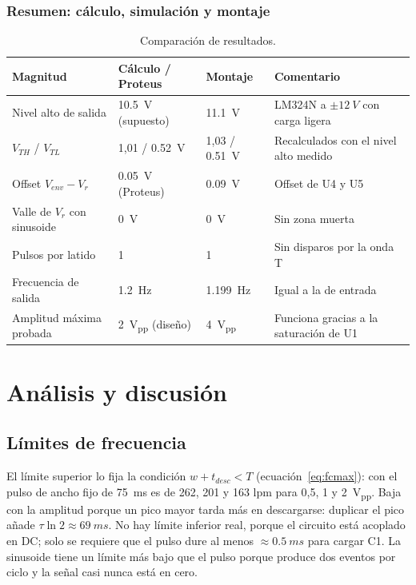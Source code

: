 \documentclass[11pt,letterpaper]{article}
\newcommand{\Vr}{V_r}
\newcommand{\Venv}{V_{env}}
\newcommand{\VTH}{V_{TH}}
\newcommand{\VTL}{V_{TL}}
\begin{document}
\subsubsection{Resumen: cálculo, simulación y montaje}

\begin{table}[H]
\centering
\caption{Comparación de resultados.}\label{tab:labcomparacion}
\small
\begin{tabularx}{\linewidth}{@{}>{\raggedright}p{3.3cm}>{\raggedright}p{2.7cm}>{\raggedright}p{2.4cm}X@{}}
\toprule
Magnitud & Cálculo / Proteus & Montaje & Comentario \\
\midrule
Nivel alto de salida & \SI{10,5}{V} (supuesto) & \SI{11,1}{V} & LM324N a $\pm\SI{12}{V}$ con carga ligera \\
$\VTH$ / $\VTL$ & 1,01 / \SI{0,52}{V} & 1,03 / \SI{0,51}{V} & Recalculados con el nivel alto medido \\
Offset $\Venv-\Vr$ & \SI{0,05}{V} (Proteus) & \SI{0,09}{V} & Offset de U4 y U5 \\
Valle de $\Vr$ con sinusoide & \SI{0}{V} & \SI{0}{V} & Sin zona muerta \\
Pulsos por latido & 1 & 1 & Sin disparos por la onda T \\
Frecuencia de salida & \SI{1,2}{Hz} & \SI{1,199}{Hz} & Igual a la de entrada \\
Amplitud máxima probada & \SI{2}{V_{pp}} (diseño) & \SI{4}{V_{pp}} & Funciona gracias a la saturación de U1 \\
\bottomrule
\end{tabularx}
\end{table}

\section{Análisis y discusión}

\subsection{Límites de frecuencia}
El límite superior lo fija la condición $w+t_{desc}<T$ (ecuación~\ref{eq:fcmax}): con el pulso de ancho fijo de \SI{75}{ms} es de 262, 201 y 163 lpm para 0,5, 1 y \SI{2}{V_{pp}}. Baja con la amplitud porque un pico mayor tarda más en descargarse: duplicar el pico añade $\tau\ln2\approx\SI{69}{ms}$. No hay límite inferior real, porque el circuito está acoplado en DC; solo se requiere que el pulso dure al menos $\approx\SI{0,5}{ms}$ para cargar C1. La sinusoide tiene un límite más bajo que el pulso porque produce dos eventos por ciclo y la señal casi nunca está en cero.
\end{document}
